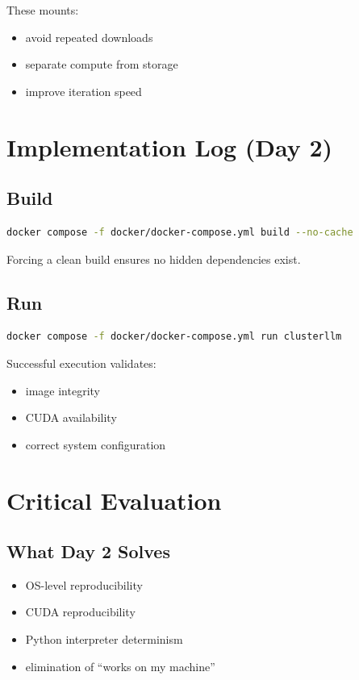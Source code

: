 \documentclass[11pt, a4paper]{article}
\begin{document}
These mounts:
\begin{itemize}
    \item avoid repeated downloads
    \item separate compute from storage
    \item improve iteration speed
\end{itemize}

\section{Implementation Log (Day 2)}

\subsection{Build}
\begin{lstlisting}[language=bash]
docker compose -f docker/docker-compose.yml build --no-cache
\end{lstlisting}

Forcing a clean build ensures no hidden dependencies exist.

\subsection{Run}
\begin{lstlisting}[language=bash]
docker compose -f docker/docker-compose.yml run clusterllm
\end{lstlisting}

Successful execution validates:
\begin{itemize}
    \item image integrity
    \item CUDA availability
    \item correct system configuration
\end{itemize}

\section{Critical Evaluation}

\subsection{What Day 2 Solves}
\begin{itemize}
    \item OS-level reproducibility
    \item CUDA reproducibility
    \item Python interpreter determinism
    \item elimination of “works on my machine”
\end{itemize}
\end{document}
